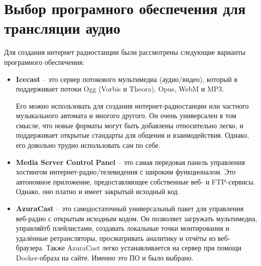 \section{Выбор програмного обеспечения для трансляции аудио}

Для создания интернет радиостанции были рассмотрены следующие варианты програмного обеспечения:

\begin{itemize}
  \item \textbf{Icecast}
        -- это сервер потокового мультимедиа (аудио/видео),  который в поддерживает потоки Ogg (Vorbis и Theora), Opus, WebM и MP3.

        Его можно использовать для создания интернет-радиостанции или частного музыкального автомата и многого другого. Он очень универсален в том смысле, что новые форматы могут быть добавлены относительно легко, и поддерживает открытые стандарты для общения и взаимодействия. Однако, его довольно трудно использовать сам по себе.
  \item \textbf{Media Server Control Panel}
        -- это самая передовая панель управления хостингом интернет-радио/телевидения с широким функционалом. Это автономное приложение, предоставляющее собственные веб- и FTP-сервисы. Однако, оно платно и имеет закрытый исходный код.
  \item \textbf{AzuraCast}
        -- это самодостаточный универсальный пакет для управления веб-радио с открытым исходным кодом. Он позволяет загружать мультимедиа, управляйтб плейлистами, создавать локальные точки монтирования и удалённые ретрансляторы, просматривать аналитику и отчёты из веб-браузера. Также AzuraCast легко устанавливается на сервер при помощи Docker-образа на сайте. Именно это ПО и было выбрано.
\end{itemize}
